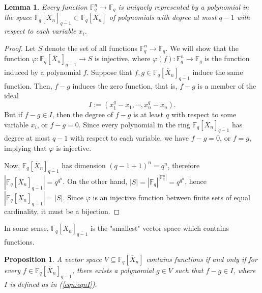 \documentclass[12pt]{amsart}
\newtheorem{proposition}[theorem]{Proposition}
\newtheorem{lemma}[theorem]{Lemma}
\theoremstyle{definition}
\newcommand{\FF}{\mathbb{F} }
\begin{document}
\begin{lemma}\label{lem: lem1}
Every function $\FF_q^n \to \FF_q$ is uniquely represented by a 
polynomial in the space $\FF_q[\overline{X}_n]_{\overline{q-1}} \subset \FF_q[\overline{X}_n]$ of polynomials with degree at most $q-1$ with respect to each variable $x_i$.
\end{lemma}
\begin{proof}
Let $S$ denote the set of all functions $\FF_q^n \to \FF_q$. We will show that the function $\varphi: \FF_q[\overline{X}_n]_{\overline{q-1}} \to S$ is injective, where $\varphi(f): \FF_q^n \to \FF_q$ is the function induced by a polynomial $f$. Suppose that $f,g \in \FF_q[\overline{X}_n]_{\overline{q-1}}$ induce the same function. Then, $f-g$ induces the zero function, that is, $f-g$ is a member of the ideal
\begin{equation}\label{eqn:eqnI}
 I := (x_1^q - x_1, \cdots, x_n^q - x_n). 
\end{equation}
But if $f-g \in I$, then the degree of $f-g$ is at least $q$ with respect to some variable $x_i$, or $f-g = 0$. Since every polynomial in the ring $\FF_q[\overline{X}_n]_{\overline{q-1}}$ has degree at most $q-1$ with respect to each variable, we have $f-g = 0$, or $f = g$, implying that $\varphi$ is injective.

Now, $\FF_q[\overline{X}_n]_{\overline{q-1}}$ has dimension $(q-1+1)^n = q^n$, therefore $|\FF_q[\overline{X}_n]_{\overline{q-1}}| = q^{q^n}$. On the other hand, $|S| = |\FF_q|^{|\FF_q^n|} = q^{q^n}$, hence $|\FF_q[\overline{X}_n]_{\overline{q-1}}| = |S|$. Since $\varphi$ is an injective function between finite sets of equal cardinality, it must be a bijection.
\end{proof}

In some sense, $\FF_q[\overline{X}_n]_{\overline{q-1}}$ is the "smallest" vector space which contains functions. 

\begin{proposition}\label{prop:nec}
A vector space $V \subseteq \FF_q[\overline{X}_n]$ contains functions if and only if for every $f \in \FF_q[\overline{X}_n]_{\overline{q-1}}$, there exists a polynomial $g \in V$ such that $f- g \in I$, where $I$ is defined as in (\ref{eqn:eqnI}).
\end{proposition}
\end{document}
